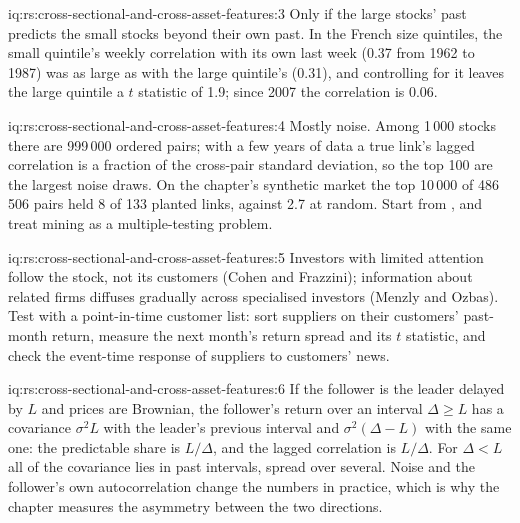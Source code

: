 \begin{solution}{iq:rs:cross-sectional-and-cross-asset-features:3}
Only if the large stocks' past predicts the small stocks beyond their own past. In the French size quintiles, the small quintile's weekly
correlation with its own last week (0.37 from 1962 to 1987) was as large as with the large quintile's (0.31), and controlling for it
leaves the large quintile a $t$ statistic of 1.9; since 2007 the correlation is 0.06.
\end{solution}

\begin{solution}{iq:rs:cross-sectional-and-cross-asset-features:4}
Mostly noise. Among 1\,000 stocks there are 999\,000 ordered pairs; with a few years of data a true link's lagged correlation is a
fraction of the cross-pair standard deviation, so the top 100 are the largest noise draws. On the chapter's synthetic market the top
10\,000 of 486\,506 pairs held 8 of 133 planted links, against 2.7 at random. Start from , and treat mining as a
multiple-testing problem.
\end{solution}

\begin{solution}{iq:rs:cross-sectional-and-cross-asset-features:5}
Investors with limited attention follow the stock, not its customers (Cohen and Frazzini); information about related firms diffuses
gradually across specialised investors (Menzly and Ozbas). Test with a point-in-time customer list: sort suppliers on their customers'
past-month return, measure the next month's return spread and its $t$ statistic, and check the event-time response of suppliers to
customers' news.
\end{solution}

\begin{solution}{iq:rs:cross-sectional-and-cross-asset-features:6}
If the follower is the leader delayed by $L$ and prices are Brownian, the follower's return over an interval $\Delta \ge L$ has a covariance
$\sigma^2 L$ with the leader's previous interval and $\sigma^2(\Delta - L)$ with the same one: the predictable share is $L/\Delta$, and the
lagged correlation is $L/\Delta$. For $\Delta < L$ all of the covariance lies in past intervals, spread over several. Noise and the
follower's own autocorrelation change the numbers in practice, which is why the chapter measures the asymmetry between the two
directions.
\end{solution}
